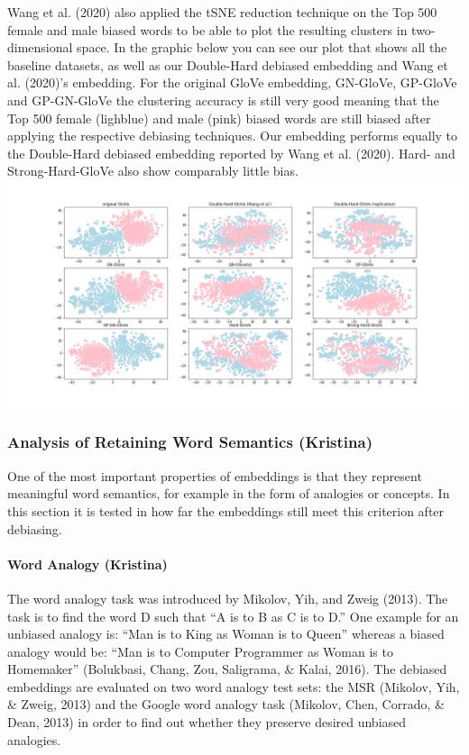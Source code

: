 \documentclass[
  english,
  man,floatsintext]{apa6}
\let\oldparagraph\paragraph
\renewcommand{\paragraph}[1]{\oldparagraph{#1}\mbox{}}
\begin{document}
Wang et al. (2020) also applied the tSNE reduction technique on the Top 500 female and male biased words to be able to plot the resulting clusters in two-dimensional space. In the graphic below you can see our plot that shows all the baseline datasets, as well as our Double-Hard debiased embedding and Wang et al. (2020)'s embedding. For the original GloVe embedding, GN-GloVe, GP-GloVe and GP-GN-GloVe the clustering accuracy is still very good meaning that the Top 500 female (lighblue) and male (pink) biased words are still biased after applying the respective debiasing techniques. Our embedding performs equally to the Double-Hard debiased embedding reported by Wang et al. (2020). Hard- and Strong-Hard-GloVe also show comparably little bias.
\includegraphics{evaluation_results/results_tsne.png}

\hypertarget{analysis-of-retaining-word-semantics-kristina}{%
\subsubsection{Analysis of Retaining Word Semantics (Kristina)}\label{analysis-of-retaining-word-semantics-kristina}}

One of the most important properties of embeddings is that they represent meaningful word semantics, for example in the form of analogies or concepts. In this section it is tested in how far the embeddings still meet this criterion after debiasing.

\hypertarget{word-analogy-kristina}{%
\paragraph{Word Analogy (Kristina)}\label{word-analogy-kristina}}

The word analogy task was introduced by Mikolov, Yih, and Zweig (2013). The task is to find the word D such that ``A is to B as C is to D.'' One example for an unbiased analogy is: ``Man is to King as Woman is to Queen'' whereas a biased analogy would be: ``Man is to Computer Programmer as Woman is to Homemaker'' (Bolukbasi, Chang, Zou, Saligrama, \& Kalai, 2016). The debiased embeddings are evaluated on two word analogy test sets: the MSR (Mikolov, Yih, \& Zweig, 2013) and the Google word analogy task (Mikolov, Chen, Corrado, \& Dean, 2013) in order to find out whether they preserve desired unbiased analogies.
\end{document}
